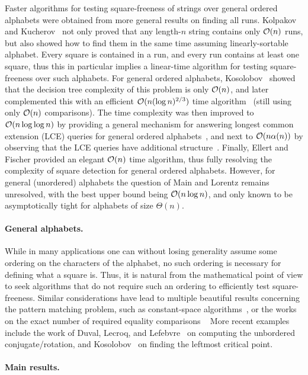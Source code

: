 Faster algorithms for testing square-freeness of strings over general ordered alphabets  were obtained from more general results on finding all runs. Kolpakov and Kucherov~\cite{Kolpakov1999} not only proved that any length-$n$
string contains only $\mathcal{O}(n)$ runs, but also showed how to find them in the same time assuming
linearly-sortable alphabet. Every square is contained in a run, and every run contains at least one square, thus this
in particular implies a linear-time algorithm for testing square-freeness over such alphabets. For general ordered alphabets,
Kosolobov~\cite{Kosolobov2015} showed that the decision tree complexity of this problem is only $\mathcal{O}(n)$, and later complemented this with an efficient $\mathcal{O}(n(\log n)^{2/3})$ time algorithm~\cite{Kosolobov2016}
(still using only $\mathcal{O}(n)$ comparisons). The time complexity was then improved to $\mathcal{O}(n\log\log n)$ by providing a general
mechanism for answering longest common extension (LCE) queries for general ordered alphabets~\cite{Gawrychowski2016},
and next to $\mathcal{O}(n\alpha(n))$ by observing that the LCE queries have additional structure~\cite{CrochemoreIKKPR16}.
Finally, Ellert and Fischer provided an elegant $\mathcal{O}(n)$ time algorithm, thus fully resolving the complexity of square detection
for general ordered alphabets. However, for general (unordered) alphabets the question of Main and Lorentz remains
unresolved, with the best upper bound being $\mathcal{O}(n\log n)$, and only known to be asymptotically tight for alphabets of
size $\Theta(n)$.

\paragraph{General alphabets.} While in many applications one can without losing generality assume some
ordering on the characters of the alphabet, no such ordering is necessary for defining what a square is. Thus, it is natural
from the mathematical point of view to seek algorithms that do not require such an ordering to efficiently test square-freeness.
Similar considerations have lead to multiple beautiful results concerning the pattern matching problem, such as constant-space algorithms~\cite{Galil1983,Breslauer1992},
or the works on the exact number of required equality comparisons ~\cite{Cole1995,Cole1997} 
 More recent examples include the work of Duval, Lecroq, and Lefebvre~\cite{Duval2014}
on computing the unbordered conjugate/rotation, and Kosolobov~\cite{Kosolobov2016a} on finding the leftmost critical point.

\paragraph{Main results.}

